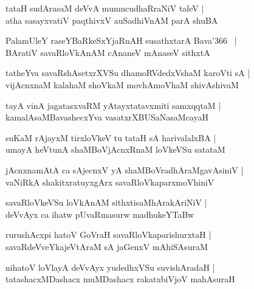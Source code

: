 \documentclass[twoside,12pt,openright]{book}
\newcounter{shloka}[chapter]
\begin{document}
\begin{shloka}%
tataH sudArasaM deVvA mumucudhaRraNiV taleV |\\
atha sasayxvatiV paqthivxV auSadhiVnAM parA shuBA 
\end{shloka}

\begin{shloka}%
PalamUleY raseYBaRkeSxYjaRnAH susathxtarA Bava\char'366 ~|\\
BAratiV savaRloVkAnAM cAnaneV mAnaseV sithxtA 
\end{shloka}

\begin{shloka}%
tatheYva savaRshAsetxrXVSu dhamoRVdedxVshaM karoVti sA |\\
vijAcnxnaM kalahaM shoVkaM movhAmoVhaM shivAshivaM 
\end{shloka}

\begin{shloka}%
tayA vinA jagatasxvaRM yAtayxtatavxmiti samxqqtaM |\\
kamalAsaMBavashecxYva vasatxrXBUSaNasaMcayaH 
\end{shloka}

\begin{shloka}%
suKaM rAjayxM tirxloVkeV tu tataH sA harivalalxBA |\\
umayA heVtunA shaMBoVjAcnxRnaM loVkeVSu satataM 
\end{shloka}

\begin{shloka}%
jAcnxnamAtA ca sAjecnxV yA shaMBoVradhAraMgavAsiniV |\\
vaNiRkA shakitxratuyxgArx savaRloVkaparxmoVhiniV 
\end{shloka}

\begin{shloka}%
savaRloVkeVSu loVkAnAM sithxtisaMhArakAriNiV |\\
deVvAyx ca ihatw pUvaRmasurw madhukeYTaBw
\end{shloka}

\begin{shloka}%
rurushAcxpi hatoV GoVraH savaRloVkaparishurxtaH |\\
savaRdeVveYkajeVtAraM sA jaGenxV mAhiSAsuraM 
\end{shloka}

\begin{shloka}%
nihatoV loVlayA deVvAyx yudedhxVSu suvishAradaH |\\
tatashacxMDashacx muMDashacx rakatxbiVjoV mahAsuraH 
\end{shloka}
\end{document}
